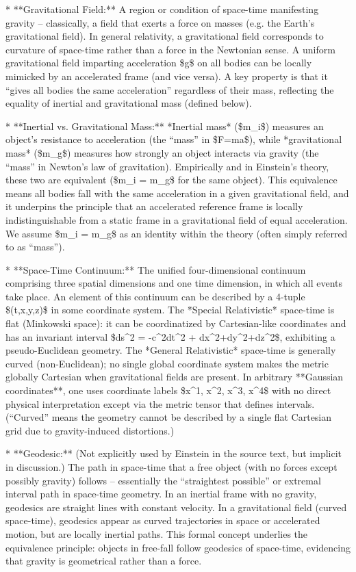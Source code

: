 \documentclass{article}
\begin{document}
* **Gravitational Field:** A region or condition of space-time manifesting gravity – classically, a field that exerts a force on masses (e.g. the Earth’s gravitational field). In general relativity, a gravitational field corresponds to curvature of space-time rather than a force in the Newtonian sense. A uniform gravitational field imparting acceleration \$g\$ on all bodies can be locally mimicked by an accelerated frame (and vice versa). A key property is that it “gives all bodies the same acceleration” regardless of their mass, reflecting the equality of inertial and gravitational mass (defined below).

* **Inertial vs. Gravitational Mass:** *Inertial mass* (\$m\_i\$) measures an object’s resistance to acceleration (the “mass” in \$F=ma\$), while *gravitational mass* (\$m\_g\$) measures how strongly an object interacts via gravity (the “mass” in Newton’s law of gravitation). Empirically and in Einstein’s theory, these two are equivalent (\$m\_i = m\_g\$ for the same object). This equivalence means all bodies fall with the same acceleration in a given gravitational field, and it underpins the principle that an accelerated reference frame is locally indistinguishable from a static frame in a gravitational field of equal acceleration. We assume \$m\_i = m\_g\$ as an identity within the theory (often simply referred to as “mass”).

* **Space-Time Continuum:** The unified four-dimensional continuum comprising three spatial dimensions and one time dimension, in which all events take place. An element of this continuum can be described by a 4-tuple \$(t,x,y,z)\$ in some coordinate system. The *Special Relativistic* space-time is flat (Minkowski space): it can be coordinatized by Cartesian-like coordinates and has an invariant interval \$ds^2 = -c^2dt^2 + dx^2+dy^2+dz^2\$, exhibiting a pseudo-Euclidean geometry. The *General Relativistic* space-time is generally curved (non-Euclidean); no single global coordinate system makes the metric globally Cartesian when gravitational fields are present. In arbitrary **Gaussian coordinates**, one uses coordinate labels \$x^1, x^2, x^3, x^4\$ with no direct physical interpretation except via the metric tensor that defines intervals. (“Curved” means the geometry cannot be described by a single flat Cartesian grid due to gravity-induced distortions.)

* **Geodesic:** (Not explicitly used by Einstein in the source text, but implicit in discussion.) The path in space-time that a free object (with no forces except possibly gravity) follows – essentially the “straightest possible” or extremal interval path in space-time geometry. In an inertial frame with no gravity, geodesics are straight lines with constant velocity. In a gravitational field (curved space-time), geodesics appear as curved trajectories in space or accelerated motion, but are locally inertial paths. This formal concept underlies the equivalence principle: objects in free-fall follow geodesics of space-time, evidencing that gravity is geometrical rather than a force.
\end{document}
